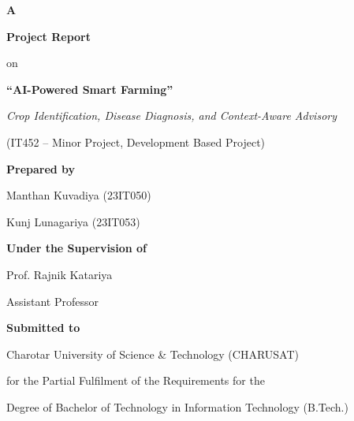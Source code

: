 \documentclass[12pt,a4paper,oneside,openany]{report}
\begin{document}

\begin{titlepage}
\thispagestyle{empty}
\begin{center}
\vspace*{0.12cm}
{\large\bfseries A}\par
{\large\bfseries Project Report}\par
{\large on}\par
\vspace{0.30cm}
{\Large\bfseries ``AI-Powered Smart Farming''}\par
\vspace{0.18cm}
{\normalsize\itshape Crop Identification, Disease Diagnosis, and Context-Aware Advisory}\par
\vspace{0.18cm}
{\normalsize (IT452 -- Minor Project, Development Based Project)}\par
\vspace{0.42cm}
{\large\bfseries Prepared by}\par
\vspace{0.10cm}
{\large Manthan Kuvadiya (23IT050)}\par
{\large Kunj Lunagariya (23IT053)}\par
\vspace{0.30cm}
{\large\bfseries Under the Supervision of}\par
{\large Prof. Rajnik Katariya}\par
{\normalsize Assistant Professor}\par
\vspace{0.30cm}
{\large\bfseries Submitted to}\par
Charotar University of Science \& Technology (CHARUSAT)\par
for the Partial Fulfilment of the Requirements for the\par
Degree of Bachelor of Technology in Information Technology (B.Tech.)\par

\end{center}
\end{titlepage}
\end{document}
